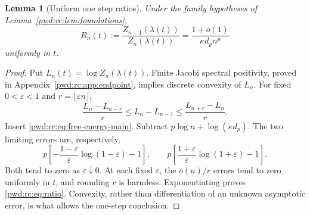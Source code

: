\documentclass[11pt,letterpaper]{article}
\numberwithin{equation}{section}
\newtheorem{lemma}[theorem]{Lemma}
\theoremstyle{remark}\newtheorem{remark}[theorem]{Remark}
\begin{document}
\begin{lemma}[Uniform one step ratios]\label{pwd:rc:lem:ratios}
Under the family hypotheses of Lemma~\ref{pwd:rc:lem:foundations},
\begin{equation}\label{pwd:rc:eq:ratio}
 R_n(t):=\frac{Z_{n-1}(\lambda(t))}{Z_n(\lambda(t))}
 =\frac{1+o(1)}{\kappa d_p n^p}
\end{equation}
uniformly in $t$.
\end{lemma}
\begin{proof}
Put $L_n(t)=\log Z_n(\lambda(t))$. Finite Jacobi spectral positivity, proved in Appendix~\ref{pwd:rc:app:endpoint}, implies discrete convexity of $L_n$. For fixed $0<\varepsilon<1$ and $r=\lfloor\varepsilon n\rfloor$,
\[
 \frac{L_n-L_{n-r}}r\le L_n-L_{n-1}
 \le\frac{L_{n+r}-L_n}r.
\]
Insert \eqref{pwd:rc:eq:free-energy-main}. Subtract $p\log n+\log(\kappa d_p)$. The two limiting errors are, respectively,
\[
 p\left[-\frac{1-\varepsilon}{\varepsilon}\log(1-\varepsilon)-1\right],\qquad
 p\left[\frac{1+\varepsilon}{\varepsilon}\log(1+\varepsilon)-1\right].
\]
Both tend to zero as $\varepsilon\downarrow0$. At each fixed $\varepsilon$, the $o(n)/r$ errors tend to zero uniformly in $t$, and rounding $r$ is harmless. Exponentiating proves \eqref{pwd:rc:eq:ratio}. Convexity, rather than differentiation of an unknown asymptotic error, is what allows the one-step conclusion.
\end{proof}
\end{document}
